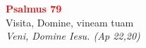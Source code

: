 


\def\greinitialformat#1{%
{\fontsize{39}{39}\selectfont #1}%
}




\vspace{0.3cm}
\begin{center}
 \textcolor{red}{\large \bf Psalmus 79}\\
Visita, Domine, vineam tuam\\
\textit{\small Veni, Domine Iesu. (Ap 22,20)}
\end{center}
